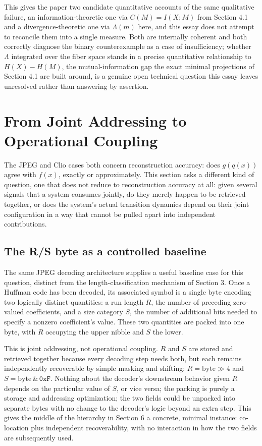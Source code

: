 \documentclass[11pt]{article}
\begin{document}
This gives the paper two candidate quantitative accounts of the same qualitative failure, an information-theoretic one via $C(M) = I(X;M)$ from Section 4.1 and a divergence-theoretic one via $\Lambda(m)$ here, and this essay does not attempt to reconcile them into a single measure. Both are internally coherent and both correctly diagnose the binary counterexample as a case of insufficiency; whether $\Lambda$ integrated over the fiber space stands in a precise quantitative relationship to $H(X) - H(M)$, the mutual-information gap the exact minimal projections of Section 4.1 are built around, is a genuine open technical question this essay leaves unresolved rather than answering by assertion.

\section{From Joint Addressing to Operational Coupling}

The JPEG and Clio cases both concern reconstruction accuracy: does $g(q(x))$ agree with $f(x)$, exactly or approximately. This section asks a different kind of question, one that does not reduce to reconstruction accuracy at all: given several signals that a system consumes jointly, do they merely happen to be retrieved together, or does the system's actual transition dynamics depend on their joint configuration in a way that cannot be pulled apart into independent contributions.

\subsection{The R/S byte as a controlled baseline}

The same JPEG decoding architecture supplies a useful baseline case for this question, distinct from the length-classification mechanism of Section 3. Once a Huffman code has been decoded, its associated symbol is a single byte encoding two logically distinct quantities: a run length $R$, the number of preceding zero-valued coefficients, and a size category $S$, the number of additional bits needed to specify a nonzero coefficient's value. These two quantities are packed into one byte, with $R$ occupying the upper nibble and $S$ the lower.

This is joint addressing, not operational coupling. $R$ and $S$ are stored and retrieved together because every decoding step needs both, but each remains independently recoverable by simple masking and shifting: $R = \mathrm{byte} \gg 4$ and $S = \mathrm{byte} \,\&\, \mathtt{0xF}$. Nothing about the decoder's downstream behavior given $R$ depends on the particular value of $S$, or vice versa; the packing is purely a storage and addressing optimization; the two fields could be unpacked into separate bytes with no change to the decoder's logic beyond an extra step. This gives the middle of the hierarchy in Section 6 a concrete, minimal instance: co-location plus independent recoverability, with no interaction in how the two fields are subsequently used.
\end{document}
